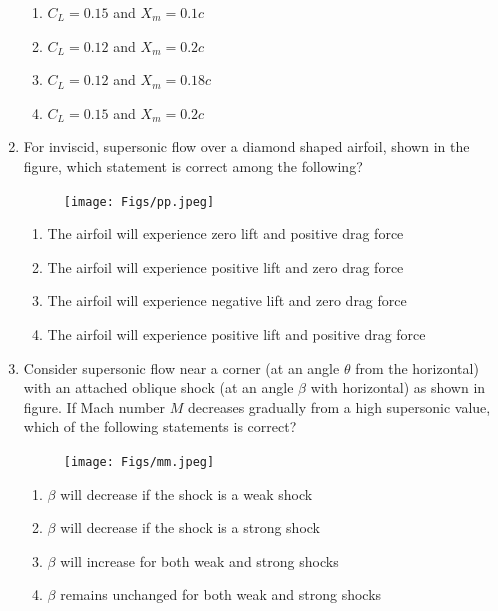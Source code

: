\documentclass[journal]{IEEEtran}
\begin{document}
\begin{enumerate}
\begin{enumerate}
    \item $C_L = 0.15$ and $X_m = 0.1c$
    \item $C_L = 0.12$ and $X_m = 0.2c$
    \item $C_L = 0.12$ and $X_m = 0.18c$
    \item $C_L = 0.15$ and $X_m = 0.2c$
\end{enumerate}
\hfill{}

\item For inviscid, supersonic flow over a diamond shaped airfoil, shown in the figure, which statement is correct among the following?

\begin{figure}[H]
\centering
\texttt{[image: Figs/pp.jpeg]}
\caption{}
\end{figure}


\begin{enumerate}
    \item The airfoil will experience zero lift and positive drag force
    \item The airfoil will experience positive lift and zero drag force
    \item The airfoil will experience negative lift and zero drag force
    \item The airfoil will experience positive lift and positive drag force
\end{enumerate}
\hfill{}

\item Consider supersonic flow near a corner (at an angle $\theta$ from the horizontal) with an attached oblique shock (at an angle $\beta$ with horizontal) as shown in figure. If Mach number $M$ decreases gradually from a high supersonic value, which of the following statements is correct?
\begin{figure}[H]
\centering
\texttt{[image: Figs/mm.jpeg]}
\caption{}
\end{figure}

\begin{enumerate}
    \item $\beta$ will decrease if the shock is a weak shock
    \item $\beta$ will decrease if the shock is a strong shock
    \item $\beta$ will increase for both weak and strong shocks
    \item $\beta$ remains unchanged for both weak and strong shocks
\end{enumerate}
\hfill{}


\end{enumerate}
\end{document}
